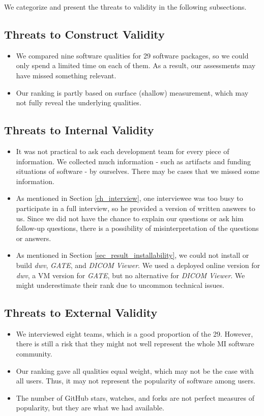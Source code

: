 \noindent We categorize and present the threats to validity in the following subsections.

\subsection{Threats to Construct Validity}
\begin{itemize}
\item We compared nine software qualities for 29 software packages, so we could only spend a limited time on each of them. As a result, our assessments may have missed something relevant.
\item Our ranking is partly based on surface (shallow) measurement, which may not fully reveal the underlying qualities.
\end{itemize}

\subsection{Threats to Internal Validity}
\begin{itemize}
\item It was not practical to ask each development team for every piece of information. We collected much information - such as artifacts and funding situations of software - by ourselves. There may be cases that we missed some information.
\item As mentioned in Section \ref{ch_interview}, one interviewee was too busy to participate in a full interview, so he provided a version of written answers to us. Since we did not have the chance to explain our questions or ask him follow-up questions, there is a possibility of misinterpretation of the questions or answers.
\item As mentioned in Section \ref{sec_result_installability}, we could not install or build \textit{dwv}, \textit{GATE}, and \textit{DICOM Viewer}. We used a deployed online version for \textit{dwv}, a VM version for \textit{GATE}, but no alternative for \textit{DICOM Viewer}. We might underestimate their rank due to uncommon technical issues.
\end{itemize}

\subsection{Threats to External Validity}
\begin{itemize}
\item We interviewed eight teams, which is a good proportion of the 29. However, there is still a risk that they might not well represent the whole MI software community.
\item Our ranking gave all qualities equal weight, which may not be the case with all users. Thus, it may not represent the popularity of software among users.
\item The number of GitHub stars, watches, and forks are not perfect measures of popularity, but they are what we had available.
\end{itemize}

